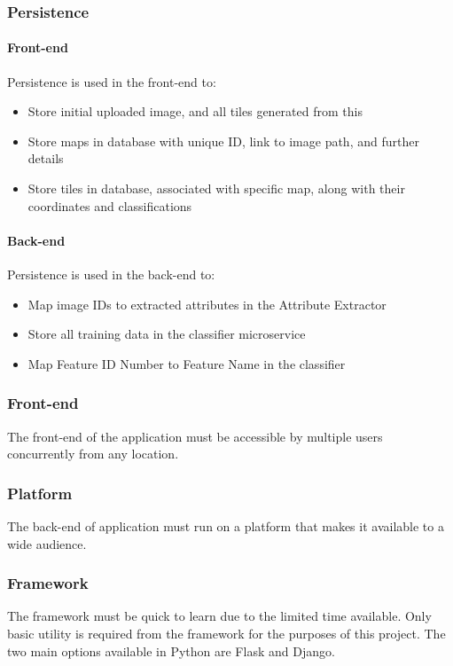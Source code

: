 \subsubsection{Persistence}
\paragraph{Front-end\\}
Persistence is used in the front-end to:
\begin{itemize}
    \item Store initial uploaded image, and all tiles generated from this
    \item Store maps in database with unique ID, link to image path, and further details
    \item Store tiles in database, associated with specific map, along with their coordinates and classifications
\end{itemize}
\paragraph{Back-end\\}
Persistence is used in the back-end to:
\begin{itemize}
    \item Map image IDs to extracted attributes in the Attribute Extractor
    \item Store all training data in the classifier microservice
    \item Map Feature ID Number to Feature Name in the classifier
\end{itemize}
\subsubsection{Front-end}
The front-end of the application must be accessible by multiple users concurrently from any location. 
\subsubsection{Platform}
The back-end of application must run on a platform that makes it available to a wide audience.
\subsubsection{Framework}
The framework must be quick to learn due to the limited time available. Only basic utility is required from the framework for the purposes of this project. The two main options available in Python are Flask and Django. 
